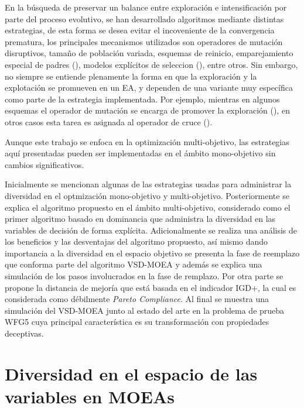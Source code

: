 En la búsqueda de preservar un balance entre exploración e intensificación por parte del proceso evolutivo, se han desarrollado algoritmos mediante distintas estrategias, de esta forma se desea evitar el incoveniente de la convergencia prematura, los principales mecanismos utilizados son operadores de mutación disruptivos, tamaño de población variada, esquemas de reinicio, emparejamiento especial de padres (\cite{Joel:MOEAD_AMS}), modelos explícitos de seleccion (\cite{Joel:MULTI_DYNAMIC}), entre otros.
%
Sin embargo, no siempre se entiende plenamente la forma en que la exploración y la explotación se promueven en un EA, y dependen de una variante muy específica como parte de la estrategia implementada.
%
Por ejemplo, mientras en algunos esquemas el operador de mutación se encarga de promover la exploración (\cite{Joel:herrera2003fuzzy, Joel:CHC}), en otros casos esta tarea es asignada al operador de cruce (\cite{Joel:sivanandam2007introduction}). 


Aunque este trabajo se enfoca en la optimización multi-objetivo, las estrategias aquí presentadas pueden ser implementadas en el ámbito mono-objetivo sin cambios significativos.
%

Inicialmente se mencionan algunas de las estrategias usadas para administrar la diversidad en el optmización mono-objetivo y multi-objetivo.
%
Posteriormente se explica el algoritmo propuesto en el ámbito multi-objetivo, considerado como el primer algoritmo basado en dominancia que administra la diversidad en las variables de decisión de forma explícita.
%
%
Adicionalmente se realiza una análisis de los beneficios y las desventajas del algoritmo propuesto, así mismo dando importancia a la diversidad en el espacio objetivo se presenta la fase de reemplazo que conforma parte del algoritmo VSD-MOEA y además se explica una simulación de los pasos involucrados en la fase de remplazo.
%
Por otra parte se propone la distancia de mejoría que está basada en el indicador IGD+, la cual es considerada como débilmente \textit{Pareto Compliance}.
%
Al final se muestra una simulación del VSD-MOEA junto al estado del arte en la problema de prueba WFG5 cuya principal característica es su transformación con propiedades deceptivas.

\section{Diversidad en el espacio de las variables en MOEAs}

